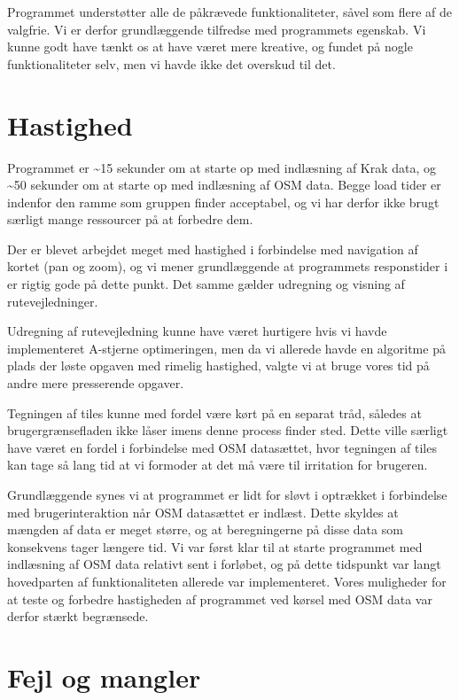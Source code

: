 Programmet understøtter alle de påkrævede funktionaliteter, såvel som flere af de valgfrie. Vi er derfor grundlæggende tilfredse med programmets egenskab. Vi kunne godt have tænkt os at have været mere kreative, og fundet på nogle funktionaliteter selv, men vi havde ikke det overskud til det.

\section{Hastighed}
\label{sec:hastighed}

Programmet er \textasciitilde15 sekunder om at starte op med indlæsning af Krak data, og \textasciitilde50 sekunder om at starte op med indlæsning af OSM data. Begge load tider er indenfor den ramme som gruppen finder acceptabel, og vi har derfor ikke brugt særligt mange ressourcer på at forbedre dem.

Der er blevet arbejdet meget med hastighed i forbindelse med navigation af kortet (pan og zoom), og vi mener grundlæggende at programmets responstider i er rigtig gode på dette punkt. Det samme gælder udregning og visning af rutevejledninger.

Udregning af rutevejledning kunne have været hurtigere hvis vi havde implementeret A-stjerne optimeringen, men da vi allerede havde en algoritme på plads der løste opgaven med rimelig hastighed, valgte vi at bruge vores tid på andre mere presserende opgaver.

Tegningen af tiles kunne med fordel være kørt på en separat tråd, således at brugergrænsefladen ikke låser imens denne process finder sted. Dette ville særligt have været en fordel i forbindelse med OSM datasættet, hvor tegningen af tiles kan tage så lang tid at vi formoder at det må være til irritation for brugeren.

Grundlæggende synes vi at programmet er lidt for sløvt i optrækket i forbindelse med brugerinteraktion når OSM datasættet er indlæst. Dette skyldes at mængden af data er meget større, og at beregningerne på disse data som konsekvens tager længere tid. Vi var først klar til at starte programmet med indlæsning af OSM data relativt sent i forløbet, og på dette tidspunkt var langt hovedparten af funktionaliteten allerede var implementeret. Vores muligheder for at teste og forbedre hastigheden af programmet ved kørsel med OSM data var derfor stærkt begrænsede.

\section{Fejl og mangler}
\label{sec:fejlOgMangler}

